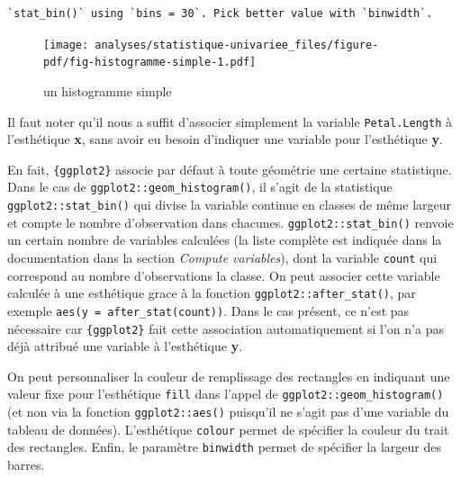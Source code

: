 \documentclass[
  letterpaper,
  DIV=11,
  numbers=noendperiod,
  oneside]{scrreprt}
\begin{document}
\begin{verbatim}
`stat_bin()` using `bins = 30`. Pick better value with `binwidth`.
\end{verbatim}

\begin{figure}[H]

{\centering \texttt{[image: analyses/statistique-univariee\_files/figure-pdf/fig-histogramme-simple-1.pdf]}

}

\caption{\label{fig-histogramme-simple}un histogramme simple}

\end{figure}

\begin{tcolorbox}[enhanced jigsaw, colbacktitle=quarto-callout-tip-color!10!white, opacityback=0, toprule=.15mm, colback=white, coltitle=black, bottomtitle=1mm, toptitle=1mm, titlerule=0mm, rightrule=.15mm, title=\textcolor{quarto-callout-tip-color}{\faLightbulb}\hspace{0.5em}{Astuce}, breakable, bottomrule=.15mm, opacitybacktitle=0.6, arc=.35mm, left=2mm, leftrule=.75mm, colframe=quarto-callout-tip-color-frame]

Il faut noter qu'il nous a suffit d'associer simplement la variable
\texttt{Petal.Length} à l'esthétique \textbf{x}, sans avoir eu besoin
d'indiquer une variable pour l'esthétique \textbf{y}.

En fait, \texttt{\{ggplot2\}} associe par défaut à toute géométrie une
certaine statistique. Dans le cas de
\texttt{ggplot2::geom\_histogram()}, il s'agit de la statistique
\texttt{ggplot2::stat\_bin()} qui divise la variable continue en classes
de même largeur et compte le nombre d'observation dans chacunes.
\texttt{ggplot2::stat\_bin()} renvoie un certain nombre de variables
calculées (la liste complète est indiquée dans la documentation dans la
section \emph{Compute variables}), dont la variable \texttt{count} qui
correspond au nombre d'observations la classe. On peut associer cette
variable calculée à une esthétique grace à la fonction
\texttt{ggplot2::after\_stat()}, par exemple
\texttt{aes(y\ =\ after\_stat(count))}. Dans le cas présent, ce n'est
pas nécessaire car \texttt{\{ggplot2\}} fait cette association
automatiquement si l'on n'a pas déjà attribué une variable à
l'esthétique \textbf{y}.

\end{tcolorbox}

On peut personnaliser la couleur de remplissage des rectangles en
indiquant une valeur fixe pour l'esthétique \texttt{fill} dans l'appel
de \texttt{ggplot2::geom\_histogram()} (et non via la fonction
\texttt{ggplot2::aes()} puisqu'il ne s'agit pas d'une variable du
tableau de données). L'esthétique \texttt{colour} permet de spécifier la
couleur du trait des rectangles. Enfin, le paramètre \texttt{binwidth}
permet de spécifier la largeur des barres.
\end{document}
